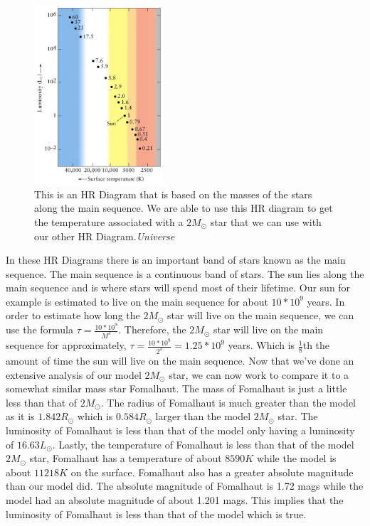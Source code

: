 \documentclass{article}
\begin{document}
\begin{figure}
  \centering
  \includegraphics[width=0.43\textwidth]{HRD2.jpg}
  \caption{This is an HR Diagram that is based on the masses of the stars along the main sequence. We are able to use this HR diagram to get the temperature associated with a $2M_\odot$ star that we can use with our other HR Diagram.\textit{Universe}}
  \label{fig:HRD2}
\end{figure}

\begin{multicols}{2}

In these HR Diagrams there is an important band of stars known as the main sequence. The main sequence is a continuous band of stars. The sun lies along the main sequence and is where stars will spend most of their lifetime. Our sun for example is estimated to live on the main sequence for about $10*10^9$ years. In order to estimate how long the $2M_\odot$ star will live on the main sequence, we can use the formula $\tau = \frac{10*10^9}{M^3}$. Therefore, the $2M_\odot$ star will live on the main sequence for approximately, $\tau = \frac{10*10^9}{2^3} = 1.25*10^9$ years. Which is $\frac{1}{8}$th the amount of time the sun will live on the main sequence. 
Now that we've done an extensive analysis of our model $2M_\odot$ star, we can now work to compare it to a somewhat similar mass star Fomalhaut. The mass of Fomalhaut is just a little less than that of $2M_\odot$. The radius of Fomalhaut is much greater than the model as it is $1.842R_\odot$ which is $0.584 R_\odot$ larger than the model $2M_\odot$ star. The luminosity of Fomalhaut is less than that of the model only having a luminosity of $16.63L_\odot$. Lastly, the temperature of Fomalhaut is less than that of the model $2M_\odot$ star, Fomalhaut has a temperature of about $8590K$ while the model is about $11218K$ on the surface. Fomalhaut also has a greater absolute magnitude than our model did. The absolute magnitude of Fomalhaut is 1.72 mags while the model had an absolute magnitude of about 1.201 mags. This implies that the luminosity of Fomalhaut is less than that of the model which is true. 

\end{multicols}
\end{document}
